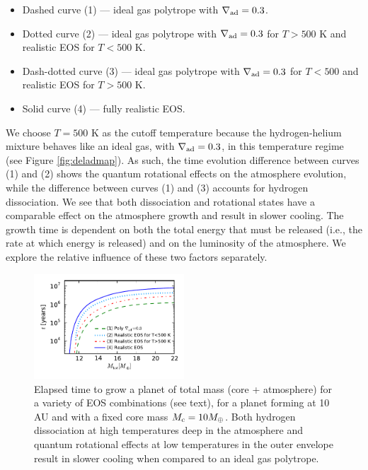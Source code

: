 \documentclass[apj]{emulateapj}
\newcommand{\delad}{\nabla_{\rm ad}}
\begin{document}
\begin{itemize}
\item Dashed curve (1) --- ideal gas polytrope with $\delad=0.3$.
\item Dotted curve (2) --- ideal gas polytrope with $\delad=0.3$ for $T>500$ K and realistic EOS for $T<500$ K.
\item Dash-dotted curve (3) --- ideal gas polytrope with $\delad=0.3$ for $T<500$ and realistic EOS for $T>500$ K.
\item Solid curve (4) --- fully realistic EOS.
\end{itemize}
We choose $T=500$ K as the cutoff temperature because the hydrogen-helium mixture behaves like an ideal gas, with $\delad=0.3$, in this temperature regime (see Figure \ref{fig:deladmap}). As such, the time evolution difference between curves (1) and (2) shows the quantum rotational effects on the atmosphere evolution, while the difference between curves (1) and (3) accounts for hydrogen dissociation. We see that both dissociation and rotational states have a comparable effect on the atmosphere growth and result in slower cooling. The growth time is dependent on both the total energy that must be released (i.e., the rate at which energy is released) and on the luminosity of the atmosphere. We explore the relative influence of these two factors separately.

\begin{figure}[h]
\centering
\includegraphics[width=0.5\textwidth]{../../figs/ModelAtmospheres/RadSelfGravRealEOS/PaperFigs/tplot.pdf}
\caption{Elapsed time to grow a planet of total mass (core + atmosphere) for a variety of EOS combinations (see text), for a planet forming at 10 AU and with a fixed core mass $M_{\rm c}=10 M_{\oplus}$. Both hydrogen dissociation at high temperatures deep in the atmosphere and quantum rotational effects at low temperatures in the outer envelope result in slower cooling when compared to an ideal gas polytrope.}
\label{fig:tplotall}
\end{figure}
\end{document}
